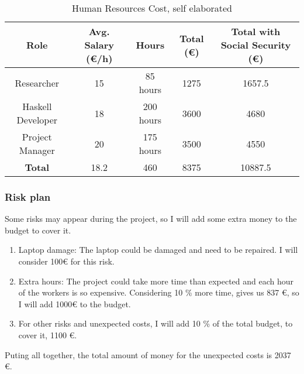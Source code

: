 \begin{table}[H]
    \begin{adjustwidth}{-1in}{-1in} %
    \centering
    \begin{tabular}{|c|c|c|c|c|}
    \hline
    \textbf{Role} & \textbf{Avg. Salary (€/h)} & \textbf{Hours} & \textbf{Total (€)} & \textbf{Total with Social Security (€)} \\ 
    \hline
    Researcher & 15 & 85 hours & 1275 & 1657.5\\
    \hline
    Haskell Developer & 18 & 200 hours & 3600 & 4680\\
    \hline
    Project Manager & 20 & 175 hours & 3500 & 4550\\
    \hline
    \hline
    \textbf{Total} & 18.2 & 460 & 8375 &  10887.5\\
    \hline
    \end{tabular}
    \caption{Human Resources Cost, self elaborated}
    \label{human_resources}
    \end{adjustwidth}
    \end{table}
\subsubsection*{Risk plan}
Some risks may appear during the project, so I will add some extra money to the budget to cover it.
\begin{enumerate}
    \item Laptop damage: The laptop could be damaged and need to be repaired. I will consider 100€ for this risk.
    \item Extra hours: The project could take more time than expected and each hour of the workers is so expensive. Considering 10 \% more time, gives us 837 €, so I will add 1000€ to the budget.
    \item For other risks and unexpected costs, I will add 10 \% of the total budget, to cover it, 1100 €.
\end{enumerate}
Puting all together, the total amount of money for the unexpected costs is 2037 €.
